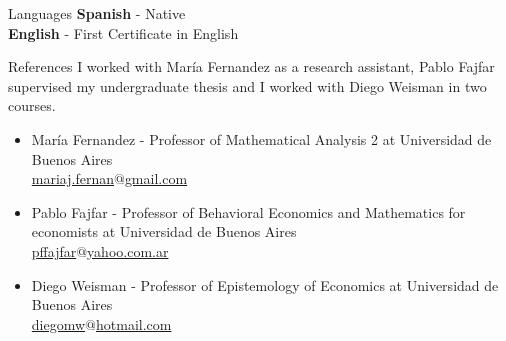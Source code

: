 \documentclass{resume} %
\begin{document}
\begin{rSection}{Languages}
{\bf Spanish} - Native\\
{\bf English} - First Certificate in English
\end{rSection}



\begin{rSection}{References}
I worked with María Fernandez as a research assistant, Pablo Fajfar supervised my undergraduate thesis and I worked with Diego Weisman in two courses.
\begin{itemize}
\item María Fernandez - Professor of Mathematical Analysis 2 at Universidad de Buenos Aires \\
 \href{mailto:mariaj.fernan$@$gmail.com}{mariaj.fernan$@$gmail.com} %
\item Pablo Fajfar - Professor of Behavioral Economics and Mathematics for economists at Universidad de Buenos Aires \\
\href{mailto:pffajfar$@$yahoo.com.ar}{pffajfar$@$yahoo.com.ar} %
\item Diego Weisman  - Professor of Epistemology of Economics at Universidad de Buenos Aires \\ \href{mailto:diego_mw$@$hotmail.com}{diego\textunderscore mw$@$hotmail.com} %
\end{itemize}
\end{rSection}
\end{document}

